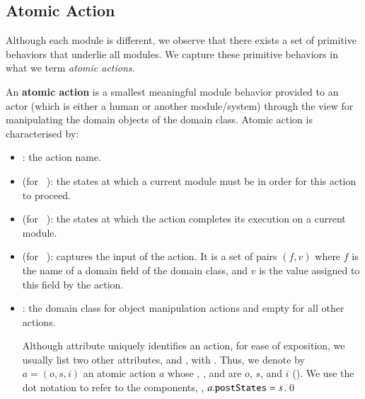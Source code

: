 \subsection{Atomic Action} \label{sect:arch-atomic-action}
Although each module is different, we observe that there exists a set of primitive behaviors that underlie all modules. We capture these primitive behaviors in what we term \textit{atomic actions}.
%
\begin{definition} \label{def:atomic-action}
	An \textbf{atomic action} is a smallest meaningful module behavior provided to an actor (which is either a human or another module/system) through the view for manipulating the domain objects of the domain class.
	Atomic action is characterised by: 
	\begin{itemize}
		\item {}: the action name.
		\item {} (for ~\cite{omg_unified_2017}): the states at which a current module must be in order for this action to proceed.
		\item {} (for ~\cite{omg_unified_2017}): the states at which the action completes its execution on a current module.
		\item {} (for ~\cite{omg_unified_2017}): captures the input of the action. It is a set of pairs $(f,v)$ where $f$ is the name of a domain field of the domain class, and $v$ is the value assigned to this field by the action. 
		\item {}: the domain class for object manipulation actions and empty for all other actions.
		
		Although attribute  uniquely identifies an action, for ease of exposition, we usually list two other attributes,  and , with .
		Thus, we denote by $ a = (o,s,i) $ an atomic action $a$ whose , , and  are $ o $, $ s $, and $i$ (\resp). We use the dot notation to refer to the components, \eg, $ a.{\tt postStates} = s$.\qed
	\end{itemize}
\end{definition}

